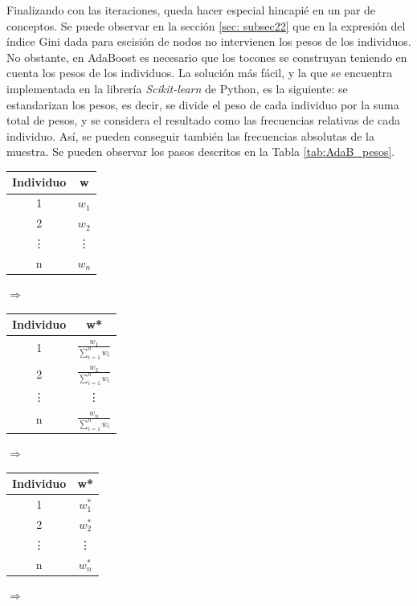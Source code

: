 \documentclass[12pt,twoside]{article}
\begin{document}
Finalizando con las iteraciones, queda hacer especial hincapié en un par de conceptos. Se puede observar en la sección \ref{sec: subsec22} que en la expresión del índice Gini dada para escisión de nodos no intervienen los pesos de los individuos. No obstante, en AdaBoost es necesario que los tocones se construyan teniendo en cuenta los pesos de los individuos. La solución más fácil, y la que se encuentra implementada en la librería \emph{Scikit-learn} de Python, es la siguiente: se estandarizan los pesos, es decir, se divide el peso de cada individuo por la suma total de pesos, y se considera el resultado como las frecuencias relativas de cada individuo. Así, se pueden conseguir también las frecuencias absolutas de la muestra. Se pueden observar los pasos descritos en la Tabla \ref{tab:AdaB_pesos}.
\begin{table}[h]
\centering
\begin{tabular}{|c|c|}
\hline
Individuo & w \\ \hline
1 & $w_1$ \\ \hline
2 & $w_2$ \\ \hline
\vdots & \vdots \\ \hline
n & $w_n$ \\ \hline
\end{tabular}
$\Rightarrow$
\begin{tabular}{|c|c|}
\hline
Individuo & w* \\ \hline
1 & $\frac{w_1}{\sum_{i=1}^n w_i}$ \\ \hline
2 & $\frac{w_2}{\sum_{i=1}^n w_i}$ \\ \hline
\vdots & \vdots \\ \hline
n & $\frac{w_n}{\sum_{i=1}^n w_i}$ \\ \hline
\end{tabular}
$\Rightarrow$
\begin{tabular}{|c|c|}
\hline
Individuo & w* \\ \hline
1 & $w_1^*$ \\ \hline
2 & $w_2^*$ \\ \hline
\vdots & \vdots \\ \hline
n & $w_n^*$ \\ \hline
\end{tabular}
$\Rightarrow$
\end{table}
\end{document}
